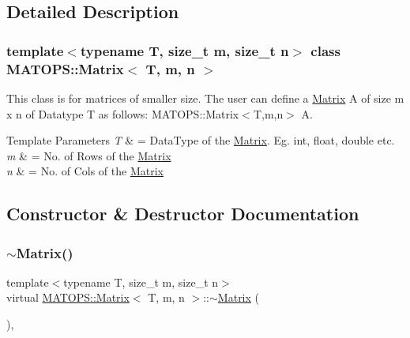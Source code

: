 \subsection{Detailed Description}
\subsubsection*{template$<$typename T, size\+\_\+t m, size\+\_\+t n$>$\newline
class M\+A\+T\+O\+P\+S\+::\+Matrix$<$ T, m, n $>$}

This class is for matrices of smaller size. The user can define a \hyperlink{classMATOPS_1_1Matrix}{Matrix} A of size m x n of Datatype T as follows\+: M\+A\+T\+O\+P\+S\+::\+Matrix$<$\+T,m,n$>$ A. 


\begin{DoxyTemplParams}{Template Parameters}
{\em T} & = Data\+Type of the \hyperlink{classMATOPS_1_1Matrix}{Matrix}. Eg. int, float, double etc. \\
\hline
{\em m} & = No. of Rows of the \hyperlink{classMATOPS_1_1Matrix}{Matrix} \\
\hline
{\em n} & = No. of Cols of the \hyperlink{classMATOPS_1_1Matrix}{Matrix} \\
\hline
\end{DoxyTemplParams}


\subsection{Constructor \& Destructor Documentation}
\mbox{\label{classMATOPS_1_1Matrix_a9e67c9220ad942e35655ff62ad268365}} 
\subsubsection{\texorpdfstring{$\sim$\+Matrix()}{~Matrix()}}
{\footnotesize\ttfamily template$<$typename T, size\+\_\+t m, size\+\_\+t n$>$ \\
virtual \hyperlink{classMATOPS_1_1Matrix}{M\+A\+T\+O\+P\+S\+::\+Matrix}$<$ T, m, n $>$\+::$\sim$\hyperlink{classMATOPS_1_1Matrix}{Matrix} (\begin{DoxyParamCaption}{ }\end{DoxyParamCaption})\hspace{0.3cm}{\ttfamily [inline]}, {\ttfamily [virtual]}}

